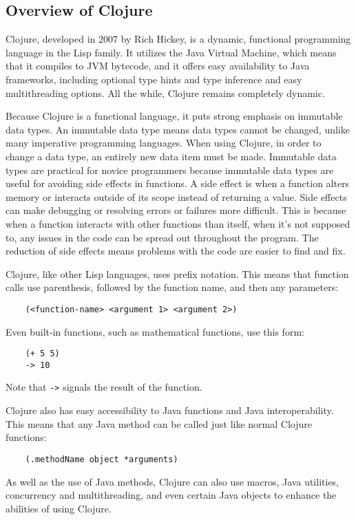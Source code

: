 \documentclass[12pt]{article}
\begin{document}
\subsection{Overview of Clojure}\label{sec:clojure}
Clojure, developed in 2007 by Rich Hickey, is a dynamic, functional programming language in the Lisp family. It utilizes the Java Virtual Machine, which means that it compiles to JVM bytecode, and it offers easy availability to Java frameworks, including optional type hints and type inference and easy multithreading options. All the while, Clojure remains completely dynamic.

Because Clojure is a functional language, it puts strong emphasis on immutable data types. An immutable data type means data types cannot be changed, unlike many imperative programming languages. When using Clojure, in order to change a data type, an entirely new data item must be made. Immutable data types are practical for novice programmers because immutable data types are useful for avoiding side effects in functions. A side effect is when a function alters memory or interacts outside of its scope instead of returning a value. Side effects can make debugging or resolving errors or failures more difficult. This is because when a function interacts with other functions than itself, when it's not supposed to, any issues in the code can be spread out throughout the program. The reduction of side effects means problems with the code are easier to find and fix.

Clojure, like other Lisp languages, uses prefix notation. This means that function calls use parenthesis, followed by the function name, and then any parameters:
\begin{verbatim}
	(<function-name> <argument 1> <argument 2>)
\end{verbatim}

Even built-in functions, such as mathematical functions, use this form:
\begin{verbatim}
	(+ 5 5)
	-> 10
\end{verbatim}

Note that \texttt{->} signals the result of the function.

Clojure also has easy accessibility to Java functions and Java interoperability. This means that any Java method can be called just like normal Clojure functions:
\begin{verbatim}
	(.methodName object *arguments)
\end{verbatim}

As well as the use of Java methods, Clojure can also use macros, Java utilities, concurrency and multithreading, and even certain Java objects to enhance the abilities of using Clojure.
\end{document}
